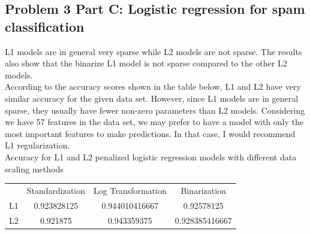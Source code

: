\documentclass[12pt]{article}
\begin{document}
\subsection*{Problem 3 Part C: Logistic regression for spam classification}
L1 models are in general very sparse while L2 models are not sparse. The results also show that the binarize L1 model is not sparse compared to the other L2 models.\\[0.5cm]
According to the accuracy scores shown in the table below, L1 and L2 have very similar accuracy for the given data set. However, since L1 models are in general sparse, they usually have fewer non-zero parameters than L2 models. Considering we have 57 features in the data set, we may prefer to have a model with only the most important features to make predictions. In that case, I would recommend L1 regularization.\\[0.5cm]
Accuracy for L1 and L2 penalized logistic regression models with different data scaling methods
\begin{center}
\begin{tabular}{ c c c c}
  &  Standardization & Log Transformation & Binarization\\ 
L1 & 0.923828125 & 0.944010416667 & 0.92578125 \\  
L2 & 0.921875 & 0.943359375 &  0.928385416667  
\end{tabular}
\end{center}
\end{document}
